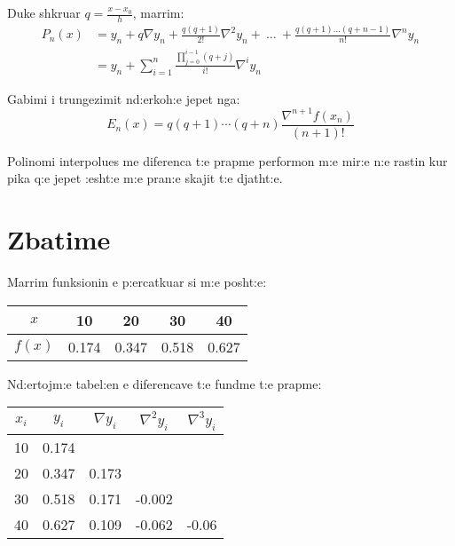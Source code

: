 \documentclass[12pt, margin=1in, a4paper]{article}
\begin{document}
  Duke shkruar \(q = \frac{x - x_0}{h}\), marrim:
  \begin{equation}
  \begin{aligned}
    P_n(x) &= y_n + q\nabla y_n + \frac{q(q + 1)}{2!}\nabla^2y_n + \ \dots \ + \frac{q(q + 1)\dots(q + n - 1)}{n!}\nabla^n y_n \\
    &= y_n + \sum_{i = 1}^n{\frac{\prod_{j = 0}^{i - 1}{(q + j)}}{i!}\nabla^iy_n}
  \end{aligned}
  \end{equation}

  Gabimi i trungezimit nd:erkoh:e jepet nga:
  \begin{equation}
    E_n(x) = q(q + 1) \cdots (q + n)\frac{\nabla^{n + 1}f(x_n)}{(n + 1)!}
  \end{equation}

  Polinomi interpolues me diferenca t:e prapme performon m:e mir:e n:e rastin
  kur pika q:e jepet :esht:e m:e pran:e skajit t:e djatht:e.

  \newpage

\section{Zbatime}
  Marrim funksionin e p:ercatkuar si m:e posht:e:
  \begin{table*}[ht]
  \begin{tabular}{|c|c|c|c|c|}
    \hline
    \(x\) & 10 & 20 & 30 & 40 \\
    \hline
    \(f(x)\) & 0.174 & 0.347 & 0.518 & 0.627 \\
    \hline
  \end{tabular}
  \end{table*}

  Nd:ertojm:e tabel:en e diferencave t:e fundme t:e prapme:
  \begin{table*}[ht]
  \begin{tabular}{|c|c|c|c|c|}
    \hline
    \(x_i\) & \(y_i\) & \(\nabla y_i\) & \(\nabla^2y_i\) & \(\nabla^3y_i\) \\
    \hline
    10 & 0.174 & & & \\
    \hline
    20 & 0.347 & 0.173 & & \\
    \hline
    30 & 0.518 & 0.171 & -0.002 & \\
    \hline
    40 & 0.627 & 0.109 & -0.062 & -0.06 \\
    \hline
  \end{tabular}
  \end{table*}
\end{document}
